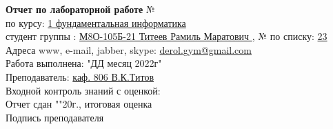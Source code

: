 \documentclass[10pt]{report}
\begin{document}
    \begin{spacing}{1.7}
        \hspace{1.2in}
        \textbf {Отчет по лабораторной работе} № \\     %
        \indent \hspace{1.2in} по курсу: \underline{1 фундаментальная информатика } \\
        \indent \hspace{1.2in} студент группы : \underline{М8О-105Б-21 Титеев Рамиль Маратович }, № по списку: \underline{ 23 } \\
        \indent \hspace{1.2in} Адреса www, e-mail, jabber, skype: \underline{ derol.gym@gmail.com } \\
        \indent \hspace{1.2in} Работа выполнена: "ДД месяц 2022г" \\   %
        \indent \hspace{1.2in} Преподаватель: \underline{ каф. 806 В.К.Титов} \\
        \indent \hspace{1.2in} Входной контроль знаний с оценкой: \tlinee{2in} \\
        \indent \hspace{1.2in} Отчет сдан "\tlinee{0.2in}"\tlinee{1in}20\tlinee{0.2in}г., итоговая оценка \tlinee{1in}\\
        \indent \hspace{1.2in} Подпись преподавателя \tlinee{1.2in}\\
    \end{spacing}
    
\end{document}
